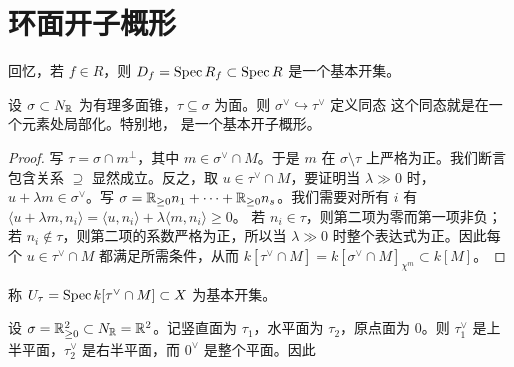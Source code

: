 \section{环面开子概形}
回忆，若 $f\in R$，则 $D_f=\operatorname{Spec} R_f\subset\operatorname{Spec} R$ 是一个基本开集。
\begin{proposition}\label{prop:4.5}
设 $\sigma\subset N_{\mathbb R}$ 为有理多面锥，$\tau\subseteq\sigma$ 为面。则 $\sigma^\vee\hookrightarrow\tau^\vee$ 定义同态
这个同态就是在一个元素处局部化。特别地，
是一个基本开子概形。
\end{proposition}
\begin{proof}
写 $\tau=\sigma\cap m^\perp$，其中 $m\in\sigma^\vee\cap M$。于是 $m$ 在 $\sigma\setminus\tau$ 上严格为正。我们断言
包含关系 $\supseteq$ 显然成立。反之，取 $u\in\tau^\vee\cap M$，要证明当 $\lambda\gg0$ 时，$u+\lambda m\in\sigma^\vee$。写 $\sigma=\mathbb R_{\ge0}n_1+\cdots+\mathbb R_{\ge0}n_s$。我们需要对所有 $i$ 有
$\langle u+\lambda m,n_i\rangle=\langle u,n_i\rangle+\lambda\langle m,n_i\rangle\ge0$。
若 $n_i\in\tau$，则第二项为零而第一项非负；若 $n_i\notin\tau$，则第二项的系数严格为正，所以当 $\lambda\gg0$ 时整个表达式为正。因此每个 $u\in\tau^\vee\cap M$ 都满足所需条件，从而
$k[\tau^\vee\cap M]=k[\sigma^\vee\cap M]_{\chi^m}\subset k[M]$。
\end{proof}
\begin{definition}\label{def:4.5}
称 $U_\tau=\operatorname{Spec} k[\tau^\vee\cap M]\subset X$ 为基本开集。
\end{definition}
\begin{example}\label{ex:4.7}
设 $\sigma=\mathbb R_{\ge0}^2\subset N_{\mathbb R}=\mathbb R^2$。记竖直面为 $\tau_1$，水平面为 $\tau_2$，原点面为 $0$。则 $\tau_1^\vee$ 是上半平面，$\tau_2^\vee$ 是右半平面，而 $0^\vee$ 是整个平面。因此
\end{example}
